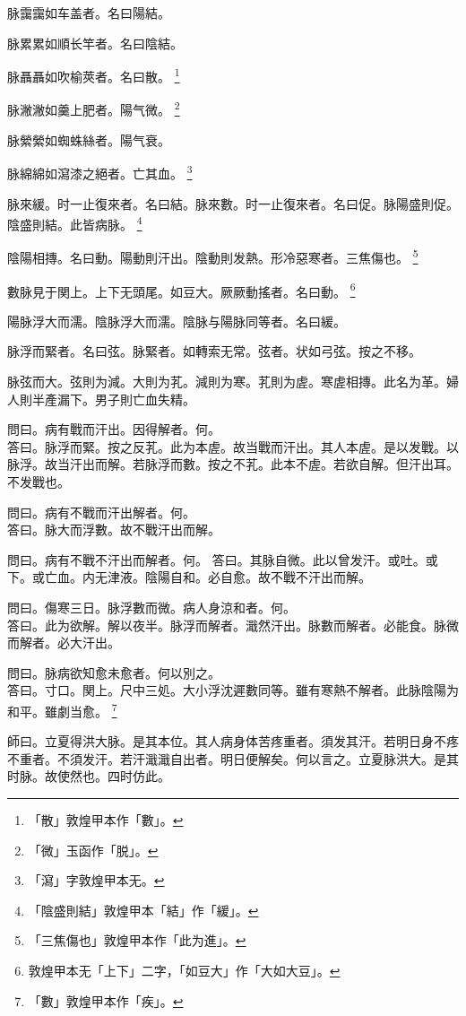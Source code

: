 脉靄靄如车盖者。名曰陽結。

脉累累如順长竿者。名曰陰結。

脉聶聶如吹榆莢者。名曰散。
	\footnote{「散」敦煌甲本作「數」。}

脉潎潎如羹上肥者。陽气微。
	\footnote{「微」玉函作「脱」。}

脉縈縈如蜘蛛絲者。陽气衰。

脉綿綿如{\khaaitp 瀉}漆之絕者。亡其血。
	\footnote{「瀉」字敦煌甲本无。}

脉來緩。时一止復來者。名曰結。脉來數。时一止復來者。名曰促。脉陽盛則促。陰盛則結。此皆病脉。
	\footnote{「陰盛則結」敦煌甲本「結」作「緩」。}

陰陽相摶。名曰動。陽動則汗出。陰動則发熱。形冷惡寒者。三焦傷也。
	\footnote{「三焦傷也」敦煌甲本作「此为進」。}

數脉見于関上。{\khaaitp 上下}无頭尾。如豆大。厥厥動搖者。名曰動。
	\footnote{敦煌甲本无「上下」二字，「如豆大」作「大如大豆」。}

陽脉浮大而濡。陰脉浮大而濡。陰脉与陽脉同等者。名曰緩。

脉浮而緊者。名曰弦。脉緊者。如轉索无常。弦者。状如弓弦。按之不移。

脉弦而大。弦則为減。大則为芤。減則为寒。芤則为虗。寒虗相摶。此名为革。婦人則半產漏下。男子則亡血失精。

問曰。病有戰而汗出。因得解者。何。\\
答曰。脉浮而緊。按之反芤。此为本虗。故当戰而汗出。其人本虗。是以发戰。以脉浮。故当汗出而解。若脉浮而數。按之不芤。此本不虗。若欲自解。但汗出耳。不发戰也。

問曰。病有不戰而汗出解者。何。\\
答曰。脉大而浮數。故不戰汗出而解。

問曰。病有不戰不汗出而解者。何。
答曰。其脉自微。此以曾发汗。或吐。或下。或亡血。内无津液。陰陽自和。必自愈。故不戰不汗出而解。

問曰。傷寒三日。脉浮數而微。病人身涼和者。何。\\
答曰。此为欲解。解以夜半。脉浮而解者。濈然汗出。脉數而解者。必能食。脉微而解者。必大汗出。

問曰。脉病欲知愈未愈者。何以別之。\\
答曰。寸口。関上。尺中三処。大小浮沈遲數同等。雖有寒熱不解者。此脉陰陽为和平。雖劇当愈。
	\footnote{「數」敦煌甲本作「疾」。}

師曰。立夏得洪大脉。是其本位。其人病身体苦疼重者。須发其汗。若明日身不疼不重者。不須发汗。若汗濈濈自出者。明日便解矣。何以言之。立夏脉洪大。是其时脉。故使然也。四时仿此。

